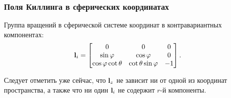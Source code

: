 \documentclass{beamer}
\begin{document}

    \begin{frame}\frametitle{Поля Киллинга в сферических координатах}

        Группа вращений в сферической системе координат в контравариантных компонентах:
        \begin{equation}
            \mathbf{l}_i
            =
            \begin{bmatrix}
                0
                    & 0
                    & 0 \\
                \sin\varphi
                    & \cos\varphi
                    & 0 \\
                \cos\varphi \cot\theta
                    & \cot\theta \sin\varphi
                    & - 1
            \end{bmatrix}
            .
        \end{equation}

         Следует отметить уже сейчас, что $\mathbf{l}_z$ не зависит ни от одной из координат пространства, а также что ни один $\mathbf{l}_i$ не содержит $r$-й компоненты.

    \end{frame}

\end{document}
